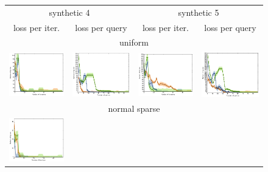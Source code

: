 \documentclass{article}
\renewcommand\[{\begin{equation}}
\renewcommand\]{\end{equation}}
\begin{document}
\begin{figure}[b]
    \centering
    {\footnotesize
    \begin{tabular}{cccc}
        \hline
        \multicolumn{2}{c}{{\sc synthetic 4}} &
        \multicolumn{2}{c}{{\sc synthetic 5}}
        \\
        {\sc loss per iter.} & {\sc loss per query} & {\sc loss per iter.} & {\sc loss per query}
        \\
        \hline \hline
        \multicolumn{4}{c}{{\sc uniform}}
        \\
        \includegraphics[width=10em]{figures/synthetic_vs_self_4_uniform_per_iter_loss} &
        \includegraphics[width=10em]{figures/synthetic_vs_self_4_uniform_per_query_loss} &
        \includegraphics[width=10em]{figures/synthetic_vs_self_5_uniform_per_iter_loss} &
        \includegraphics[width=10em]{figures/synthetic_vs_self_5_uniform_per_query_loss}
        \\
        \hline
        \multicolumn{4}{c}{{\sc normal sparse}}
        \\
        \includegraphics[width=10em]{figures/synthetic_vs_self_4_normal_sparse_per_iter_loss} &

\end{tabular}}
\end{figure}
\end{document}
